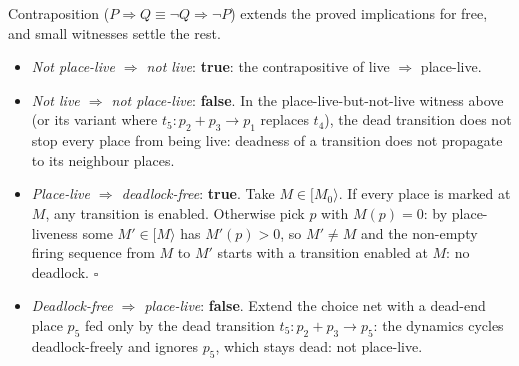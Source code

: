 Contraposition ($P \Rightarrow Q \equiv \neg Q \Rightarrow \neg P$) extends the proved implications for free, and small witnesses settle the rest.
\begin{itemize}
  \item \emph{Not place-live $\Rightarrow$ not live}: \textbf{true}: the contrapositive of live $\Rightarrow$ place-live.
  \item \emph{Not live $\Rightarrow$ not place-live}: \textbf{false}. In the place-live-but-not-live witness above (or its variant where $t_5 : p_2 + p_3 \to p_1$ replaces $t_4$), the dead transition does not stop every place from being live: deadness of a transition does not propagate to its neighbour places.
\begin{center}
\end{center}
  \item \emph{Place-live $\Rightarrow$ deadlock-free}: \textbf{true}. Take $M \in [M_0\rangle$. If every place is marked at $M$, any transition is enabled. Otherwise pick $p$ with $M(p) = 0$: by place-liveness some $M' \in [M\rangle$ has $M'(p) > 0$, so $M' \neq M$ and the non-empty firing sequence from $M$ to $M'$ starts with a transition enabled at $M$: no deadlock. $\square$
  \item \emph{Deadlock-free $\Rightarrow$ place-live}: \textbf{false}. Extend the choice net with a dead-end place $p_5$ fed only by the dead transition $t_5 : p_2 + p_3 \to p_5$: the dynamics cycles deadlock-freely and ignores $p_5$, which stays dead: not place-live.
\end{itemize}


